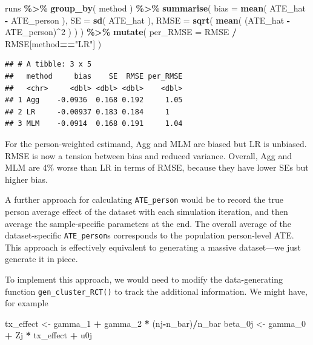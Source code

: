 \documentclass[
]{book}
\newenvironment{Shaded}{\begin{snugshade}}{\end{snugshade}}
\newcommand{\AttributeTok}[1]{\textcolor[rgb]{0.13,0.29,0.53}{#1}}
\newcommand{\DecValTok}[1]{\textcolor[rgb]{0.00,0.00,0.81}{#1}}
\newcommand{\FunctionTok}[1]{\textcolor[rgb]{0.13,0.29,0.53}{\textbf{#1}}}
\newcommand{\NormalTok}[1]{#1}
\newcommand{\OtherTok}[1]{\textcolor[rgb]{0.56,0.35,0.01}{#1}}
\newcommand{\SpecialCharTok}[1]{\textcolor[rgb]{0.81,0.36,0.00}{\textbf{#1}}}
\newcommand{\StringTok}[1]{\textcolor[rgb]{0.31,0.60,0.02}{#1}}
\begin{document}
\begin{Shaded}
\begin{Highlighting}[]
\NormalTok{runs }\SpecialCharTok{\%\textgreater{}\%} 
  \FunctionTok{group\_by}\NormalTok{( method ) }\SpecialCharTok{\%\textgreater{}\%}
  \FunctionTok{summarise}\NormalTok{( }
    \AttributeTok{bias =} \FunctionTok{mean}\NormalTok{( ATE\_hat }\SpecialCharTok{{-}}\NormalTok{ ATE\_person ),}
    \AttributeTok{SE =} \FunctionTok{sd}\NormalTok{( ATE\_hat ),}
    \AttributeTok{RMSE =} \FunctionTok{sqrt}\NormalTok{( }\FunctionTok{mean}\NormalTok{( (ATE\_hat }\SpecialCharTok{{-}}\NormalTok{ ATE\_person)}\SpecialCharTok{\^{}}\DecValTok{2}\NormalTok{ ) )}
\NormalTok{  ) }\SpecialCharTok{\%\textgreater{}\%}
  \FunctionTok{mutate}\NormalTok{( }\AttributeTok{per\_RMSE =}\NormalTok{ RMSE }\SpecialCharTok{/}\NormalTok{ RMSE[method}\SpecialCharTok{==}\StringTok{"LR"}\NormalTok{] )}
\end{Highlighting}
\end{Shaded}

\begin{verbatim}
## # A tibble: 3 x 5
##   method     bias    SE  RMSE per_RMSE
##   <chr>     <dbl> <dbl> <dbl>    <dbl>
## 1 Agg    -0.0936  0.168 0.192     1.05
## 2 LR     -0.00937 0.183 0.184     1   
## 3 MLM    -0.0914  0.168 0.191     1.04
\end{verbatim}

For the person-weighted estimand, Agg and MLM are biased but LR is unbiased.
RMSE is now a tension between bias and reduced variance.
Overall, Agg and MLM are 4\% worse than LR in terms of RMSE, because they have lower SEs but higher bias.

A further approach for calculating \texttt{ATE\_person} would be to record the true person average effect of the dataset with each simulation iteration, and then average the sample-specific parameters at the end.
The overall average of the dataset-specific \texttt{ATE\_person}s corresponds to the population person-level ATE.
This approach is effectively equivalent to generating a massive dataset---we just generate it in piece.

To implement this approach, we would need to modify the data-generating function \texttt{gen\_cluster\_RCT()} to track the additional information.
We might have, for example

\begin{Shaded}
\begin{Highlighting}[]
\NormalTok{tx\_effect }\OtherTok{\textless{}{-}}\NormalTok{ gamma\_1 }\SpecialCharTok{+}\NormalTok{ gamma\_2 }\SpecialCharTok{*}\NormalTok{ (nj}\SpecialCharTok{{-}}\NormalTok{n\_bar)}\SpecialCharTok{/}\NormalTok{n\_bar}
\NormalTok{beta\_0j }\OtherTok{\textless{}{-}}\NormalTok{ gamma\_0 }\SpecialCharTok{+}\NormalTok{ Zj }\SpecialCharTok{*}\NormalTok{ tx\_effect }\SpecialCharTok{+}\NormalTok{ u0j}
\end{Highlighting}
\end{Shaded}
\end{document}
